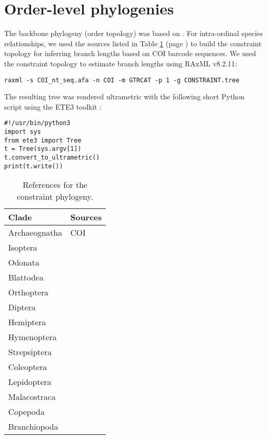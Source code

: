 \clearpage

\section{Order-level phylogenies}

The backbone phylogeny (order topology) was based on \citet{Misof2014}. For intra-ordinal species relationships, we used the sources listed in Table \ref{tab:phylogeny-sources} (page \pageref{tab:phylogeny-sources}) to build the constraint topology for inferring branch lengths based on COI barcode sequences. We used the constraint topology to estimate branch lengths using RAxML v8.2.11:

\begin{verbatim}
raxml -s COI_nt_seq.afa -n COI -m GTRCAT -p 1 -g CONSTRAINT.tree
\end{verbatim}

\begin{minipage}{\linewidth}
The resulting tree was rendered ultrametric with the following short Python script using the ETE3 toolkit \citep{Huerta-Cepas2016}:

\begin{verbatim}
#!/usr/bin/python3
import sys
from ete3 import Tree
t = Tree(sys.argv[1])
t.convert_to_ultrametric()
print(t.write())
\end{verbatim}
\end{minipage}


\begin{table}[t]
\centering
\caption[Literature sources for the constraint phylogeny]{References for the constraint phylogeny.}
\label{tab:phylogeny-sources}
\begin{tabular}{lp{25em}}
\toprule
Clade         & Sources \\
\midrule
Archaeognatha & COI \\
Isoptera      & \citet{Cameron2012} \\
Odonata       & \citet{Letsch2016} \\
Blattodea     & \citet{Wang2017}    \\
Orthoptera    & \citet{Zhang2013a}   \\
Diptera       & \citet{Wiegmann2011,Cranston2011} \\
Hemiptera     & \citet{Song2012,Ortiz-Rivas2010,Novakova2013} \\
Hymenoptera   & \citet{Peters2017,Branstetter2017,Ward2015} \\
Strepsiptera  & \citet{Pohl2005} \\
Coleoptera    & \citet{McKenna2015,Ahrens2014,Magro2010,Kergoat2014,Hundsdoerfer2009} \\
Lepidoptera   & \citet{Breinholt2018,Regier2013,Kawahara2009,Mitchell2005,Abraham2001} \\
\midrule
Malacostraca  & \citet{Tsang2008,Ahyong2004} \\
Copepoda      & \citet{Eyun2017a,Blanco-Bercial2011,Figueroa2011,Thum2004} \\
Branchiopoda  & \citet{Richter2007} \\
\bottomrule
\end{tabular}
\end{table}



